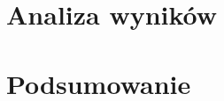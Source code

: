 \documentclass{article}
\begin{document}
\section{Analiza wyników}

\section{Podsumowanie}

\end{document}
